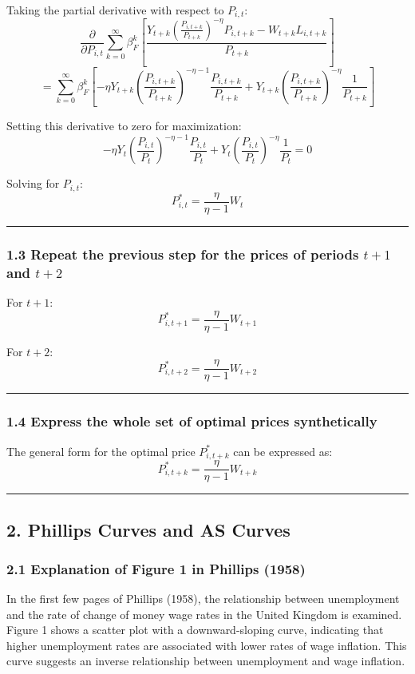 \documentclass{article}
\begin{document}
Taking the partial derivative with respect to \( P_{i,t} \):
\[
\frac{\partial}{\partial P_{i,t}} \sum_{k=0}^{\infty} \beta_F^k \left[ \frac{Y_{t+k} \left( \frac{P_{i,t+k}}{P_{t+k}} \right)^{-\eta} P_{i,t+k} - W_{t+k} L_{i,t+k}}{P_{t+k}} \right]
\]
\[
= \sum_{k=0}^{\infty} \beta_F^k \left[ -\eta Y_{t+k} \left( \frac{P_{i,t+k}}{P_{t+k}} \right)^{-\eta-1} \frac{P_{i,t+k}}{P_{t+k}} + Y_{t+k} \left( \frac{P_{i,t+k}}{P_{t+k}} \right)^{-\eta} \frac{1}{P_{t+k}} \right]
\]

Setting this derivative to zero for maximization:
\[
-\eta Y_t \left( \frac{P_{i,t}}{P_t} \right)^{-\eta-1} \frac{P_{i,t}}{P_t} + Y_t \left( \frac{P_{i,t}}{P_t} \right)^{-\eta} \frac{1}{P_t} = 0
\]

Solving for \( P_{i,t} \):
\[
P_{i,t}^* = \frac{\eta}{\eta-1} W_t
\]

\noindent\rule{\linewidth}{0.5pt}

\subsubsection*{1.3 Repeat the previous step for the prices of periods \( t+1 \) and \( t+2 \)}

For \( t+1 \):
\[
P_{i,t+1}^* = \frac{\eta}{\eta-1} W_{t+1}
\]

For \( t+2 \):
\[
P_{i,t+2}^* = \frac{\eta}{\eta-1} W_{t+2}
\]

\noindent\rule{\linewidth}{0.5pt}

\subsubsection*{1.4 Express the whole set of optimal prices synthetically}

The general form for the optimal price \( P_{i,t+k}^* \) can be expressed as:
\[
P_{i,t+k}^* = \frac{\eta}{\eta-1} W_{t+k}
\]

\noindent\rule{\linewidth}{1pt}

\subsection*{2. Phillips Curves and AS Curves}

\subsubsection*{2.1 Explanation of Figure 1 in Phillips (1958)}

In the first few pages of Phillips (1958), the relationship between unemployment and the rate of change of money wage rates in the United Kingdom is examined. Figure 1 shows a scatter plot with a downward-sloping curve, indicating that higher unemployment rates are associated with lower rates of wage inflation. This curve suggests an inverse relationship between unemployment and wage inflation.
\end{document}
